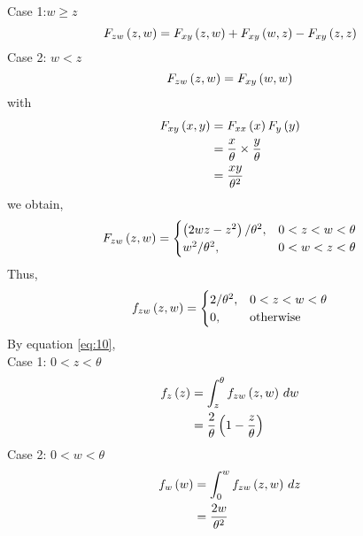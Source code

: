 \documentclass[journal,12pt,two column]{IEEEtran}
\begin{document}
Case 1:$w \geq z$
\begin{equation}
    F_{zw}\left(z,w\right) = F_{xy}\left(z,w\right) + F_{xy}\left(w,z\right) - F_{xy}\left(z,z\right)
\end{equation}
Case 2: $w < z$
\begin{equation}
    F_{zw}\left(z,w\right) = F_{xy}\left(w,w\right)
\end{equation}
with
\begin{align}
   F_{xy}\left(x,y\right) &= F_{xx}\left(x\right) F_{y}\left(y\right) \\ 
                    &= \frac{x}{\theta}\times \frac{y}{\theta} \\
                    &= \frac{xy}{\theta^2}
\end{align}
we obtain,
\begin{align}
 F_{zw}\left(z,w\right) = 
\begin{cases}
\left(2wz - z^2\right)/\theta^2, & 0 < z < w < \theta \\
w^2/\theta^2, & 0 < w < z < \theta 
\end{cases}
\end{align}
Thus, 
\begin{align}  \label{eq:10}
f_{zw}\left(z,w\right) = 
\begin{cases}
2/\theta^2, & 0 < z < w < \theta \\
0, & \text{otherwise}
\end{cases}
\end{align}
By equation \eqref{eq:10}, \\
Case 1: $0 < z < \theta$
\begin{align}
    f_{z}\left(z\right) &= \int_{z}^{\theta} f_{zw}\left(z,w\right) \,dw  \\
                  &= \frac{2}{\theta}\left(1-\frac{z}{\theta}\right)  
\end{align}
Case 2: $0 < w < \theta$
\begin{align}
    f_{w}\left(w\right) &= \int_{0}^{w} f_{zw}\left(z,w\right) \,dz  \\
                  &= \frac{2w}{\theta^2}
\end{align}
\end{document}
